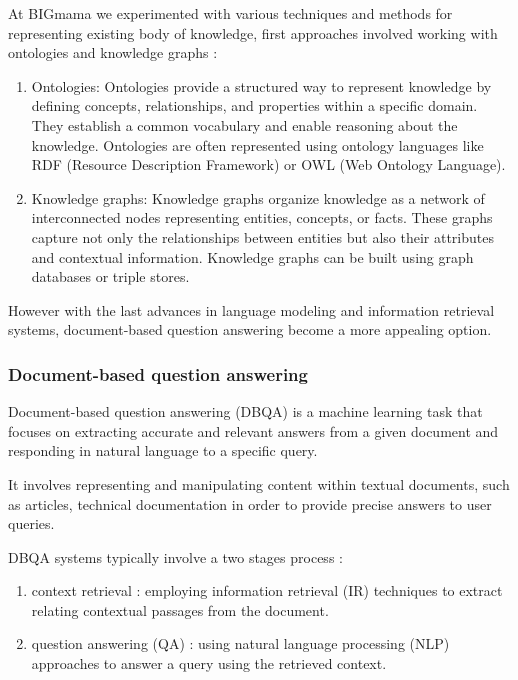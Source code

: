\documentclass[a4paper,12pt]{article}
\begin{document}
At BIGmama we experimented with various techniques and methods for representing existing body of knowledge, 
first approaches involved working with ontologies and knowledge graphs :

\begin{enumerate}
	\item Ontologies: Ontologies provide a structured way to represent knowledge by defining concepts, relationships, and properties within a specific domain. They establish a common vocabulary and enable reasoning about the knowledge. 
	      Ontologies are often represented using ontology languages like RDF (Resource Description Framework) or OWL (Web Ontology Language).
	\item Knowledge graphs: Knowledge graphs organize knowledge as a network of interconnected nodes representing entities, concepts, or facts. 
	      These graphs capture not only the relationships between entities but also their attributes and contextual information. Knowledge graphs can be built using graph databases or triple stores.
\end{enumerate}

However with the last advances in language modeling and information retrieval systems, document-based question answering become a more appealing option.  



\subsubsection{Document-based question answering}
Document-based question answering (DBQA) is a machine learning task that focuses on extracting accurate and relevant answers from a given document and responding in natural language to a specific query. 

It involves representing and manipulating content within textual documents, such as articles, technical documentation in order to provide precise answers to user queries.

DBQA systems typically involve a two stages process : 
\begin{enumerate}
	\item context retrieval : employing information retrieval (IR) techniques to extract relating contextual passages from the document.
	\item question answering (QA) : using natural language processing (NLP) approaches to answer a query using the retrieved context.  
\end{enumerate}  
\end{document}
